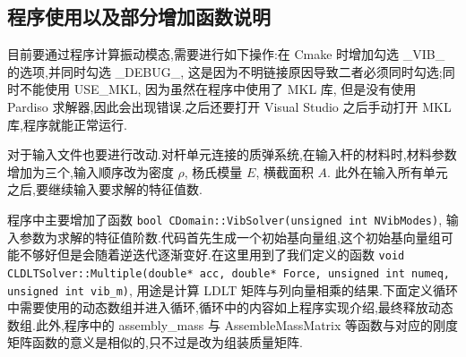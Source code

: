 \subsection{程序使用以及部分增加函数说明}
目前要通过程序计算振动模态,需要进行如下操作:在 Cmake 时增加勾选 \_VIB\_ 的选项,并同时勾选 \_DEBUG\_, 这是因为不明链接原因导致二者必须同时勾选;同时不能使用 USE\_MKL, 因为虽然在程序中使用了 MKL 库, 但是没有使用 Pardiso 求解器,因此会出现错误.之后还要打开 Visual Studio 之后手动打开 MKL 库,程序就能正常运行.

对于输入文件也要进行改动.对杆单元连接的质弹系统,在输入杆的材料时,材料参数增加为三个,输入顺序改为密度 $\rho$, 杨氏模量 $E$, 横截面积 $A$. 此外在输入所有单元之后,要继续输入要求解的特征值数.

程序中主要增加了函数 \texttt{bool CDomain::VibSolver(unsigned int NVibModes)}, 输入参数为求解的特征值阶数.代码首先生成一个初始基向量组,这个初始基向量组可能不够好但是会随着逆迭代逐渐变好.在这里用到了我们定义的函数 \texttt{void CLDLTSolver::Multiple(double* acc, double* Force, unsigned int numeq, unsigned int vib\_m)}, 用途是计算 LDLT 矩阵与列向量相乘的结果.下面定义循环中需要使用的动态数组并进入循环,循环中的内容如上程序实现介绍,最终释放动态数组.此外,程序中的 assembly\_mass 与 AssembleMassMatrix 等函数与对应的刚度矩阵函数的意义是相似的,只不过是改为组装质量矩阵.

